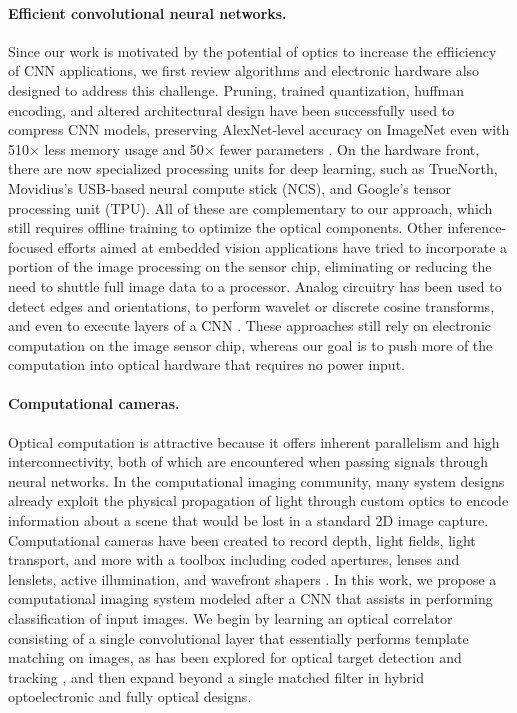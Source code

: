 \paragraph{Efficient convolutional neural networks.} 
Since our work is motivated by the potential of optics to increase the effiiciency of CNN applications, we first review algorithms and electronic hardware also designed to address this challenge. Pruning, trained quantization, huffman encoding, and altered architectural design have been successfully used to compress CNN models,  preserving AlexNet-level accuracy on ImageNet even with 510$\times$ less memory usage and 50$\times$ fewer parameters \cite{han2015deep,iandola2016squeezenet}. On the hardware front, there are now specialized processing units for deep learning, such as TrueNorth, Movidius's USB-based neural compute stick (NCS), and Google's tensor processing unit (TPU). All of these are complementary to our approach, which still requires offline training to optimize the optical components. Other inference-focused efforts aimed at embedded vision applications have tried to incorporate a portion of the image processing on the sensor chip, eliminating or reducing the need to shuttle full image data to a processor. Analog circuitry has been used to detect edges and orientations, to perform wavelet or discrete cosine transforms, and even to execute layers of a CNN \cite{gruev2002implementation,likamwa2016redeye}. These approaches still rely on electronic computation on the image sensor chip, whereas our goal is to push more of the computation into optical hardware that requires no power input. 

\paragraph{Computational cameras.} Optical computation is attractive because it offers inherent parallelism and high interconnectivity, both of which are encountered when passing signals through neural networks. In the computational imaging community, many system designs already exploit the physical propagation of light through custom optics to encode information about a scene that would be lost in a standard 2D image capture. Computational cameras have been created to record depth, light fields, light transport, and more with a toolbox including coded apertures, lenses and lenslets, active illumination, and wavefront shapers \cite{ng2005light,levin2007image,mcguire2007optical,o2010optical,chang2016variable}. In this work, we propose a computational imaging system modeled after a CNN that assists in performing classification of input images. We begin by learning an optical correlator consisting of a single convolutional layer that essentially performs template matching on images, as has been explored for optical target detection and tracking \cite{manzur2012optical,javidi1995optical}, and then expand beyond a single matched filter in hybrid optoelectronic and fully optical designs.

